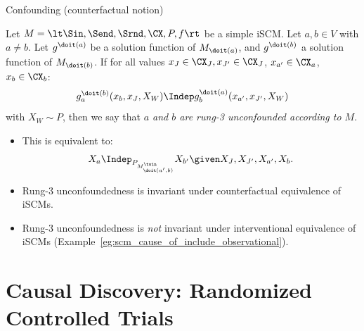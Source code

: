 \begin{frame}{Confounding (counterfactual notion)}
  
\begin{Def}[\ref{def:scm_rung3_unconfounded}]
  Let $M = \lt \Sin, \Send, \Srnd, \CX, P, f \rt$ be a simple iSCM.
  Let $a, b \in V$ with $a \ne b$.
  Let $g^{\doit(a)}$ be a solution function of $M_{\doit(a)}$, and $g^{\doit(b)}$ a solution function of $M_{\doit(b)}$.
  If for all values $x_J \in \CX_J, x_{J'} \in \CX_J$, $x_{a'} \in \CX_a$, $x_b \in \CX_b$: 
  $$g^{\doit(b)}_a(x_b,x_J,X_W) \Indep g^{\doit(a)}_b(x_{a'},x_{J'},X_W)$$
  with $X_W \sim P$, then we say that \emph{$a$ and $b$ are rung-3 unconfounded according to $M$}.
\end{Def}

  \begin{itemize}
    \item This is equivalent to:
      $$X_a \Indep_{P_{M^\twin_{\doit(a',b)}}} X_{b'} \given X_J, X_{J'}, X_{a'}, X_b.$$
    \item Rung-3 unconfoundedness is invariant under counterfactual equivalence of iSCMs.
    \item Rung-3 unconfoundedness is \emph{not} invariant under interventional equivalence of iSCMs (Example~\ref{eg:scm_cause_of_include_observational}).
  \end{itemize}
\end{frame}

\part{Causal Discovery: Randomized Controlled Trials}
\frame{\partpage}

